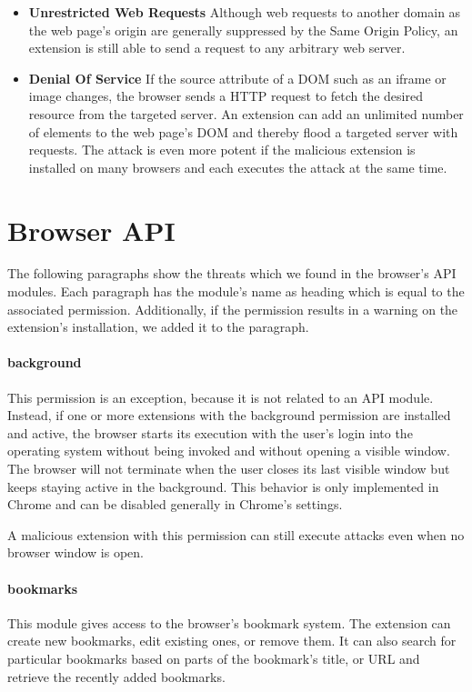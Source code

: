 \begin{itemize}
		\item \textbf{Unrestricted Web Requests} Although web requests to another domain as the web page's origin are generally suppressed by the Same Origin Policy, an extension is still able to send a request to any arbitrary web server. 
		\item \textbf{Denial Of Service} If the source attribute of a DOM such as an iframe or image changes, the browser sends a HTTP request to fetch the desired resource from the targeted server. An extension can add an unlimited number of elements to the web page's DOM and thereby flood a targeted server with requests. The attack is even more potent if the malicious extension is installed on many browsers and each executes the attack at the same time.
	\end{itemize}
	
\section{Browser API}
	
	The following paragraphs show the threats which we found in the browser's API modules. Each paragraph has the module's name as heading which is equal to the associated permission. Additionally, if the permission results in a warning on the extension's installation, we added it to the paragraph.
	
\newenvironment{permissionwarning}{%
	\setlength\topsep{4pt}
	\setlength\parskip{0pt}
	\itshape
\begin{center}
	}{%
\end{center}
}

\paragraph{background}
	This permission is an exception, because it is not related to an API module. Instead, if one or more extensions with the background permission are installed and active, the browser starts its execution with the user's login into the operating system without being invoked and without opening a visible window. The browser will not terminate when the user closes its last visible window but keeps staying active in the background. This behavior is only implemented in Chrome and can be disabled generally in Chrome's settings.
	
	A malicious extension with this permission can still execute attacks even when no browser window is open.
	
\paragraph{bookmarks} 
	This module gives access to the browser's bookmark system. The extension can create new bookmarks, edit existing ones, or remove them. It can also search for particular bookmarks based on parts of the bookmark's title, or URL and retrieve the recently added bookmarks.
	
